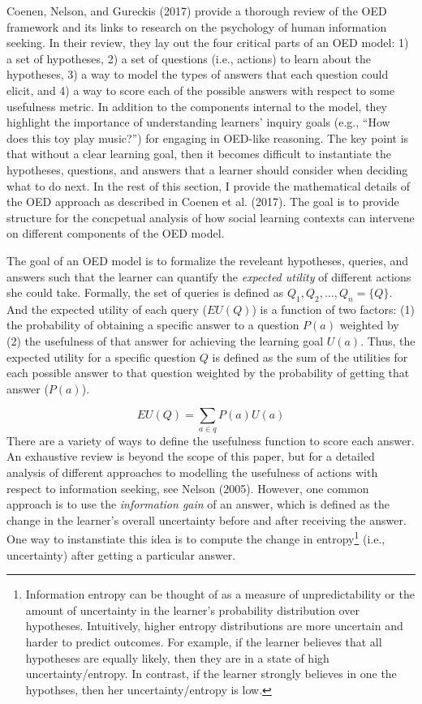 \documentclass[english,floatsintext,man]{apa6}
\theoremstyle{definition}
\theoremstyle{definition}
\theoremstyle{definition}
\theoremstyle{remark}
\begin{document}
Coenen, Nelson, and Gureckis (2017) provide a thorough review of the OED
framework and its links to research on the psychology of human
information seeking. In their review, they lay out the four critical
parts of an OED model: 1) a set of hypotheses, 2) a set of questions
(i.e., actions) to learn about the hypotheses, 3) a way to model the
types of answers that each question could elicit, and 4) a way to score
each of the possible answers with respect to some usefulness metric. In
addition to the components internal to the model, they highlight the
importance of understanding learners' inquiry goals (e.g., \enquote{How
does this toy play music?}) for engaging in OED-like reasoning. The key
point is that without a clear learning goal, then it becomes difficult
to instantiate the hypotheses, questions, and answers that a learner
should consider when deciding what to do next. In the rest of this
section, I provide the mathematical details of the OED approach as
described in Coenen et al. (2017). The goal is to provide structure for
the concpetual analysis of how social learning contexts can intervene on
different components of the OED model.

The goal of an OED model is to formalize the reveleant hypotheses,
queries, and answers such that the learner can quantify the
\emph{expected utility} of different actions she could take. Formally,
the set of queries is defined as \(Q_1, Q_2,..., Q_n = \{Q\}\). And the
expected utility of each query (\(EU(Q)\)) is a function of two factors:
(1) the probability of obtaining a specific answer to a question
\(P(a)\) weighted by (2) the usefulness of that answer for achieving the
learning goal \(U(a)\). Thus, the expected utility for a specific
question \(Q\) is defined as the sum of the utilities for each possible
answer to that question weighted by the probability of getting that
answer (\(P(a)\)).

\[EU(Q) = \sum_{a\in q}{P(a)U(a)}\] \noindent
There are a variety of ways to define the usefulness function to score
each answer. An exhaustive review is beyond the scope of this paper, but
for a detailed analysis of different approaches to modelling the
usefulness of actions with respect to information seeking, see Nelson
(2005). However, one common approach is to use the \emph{information
gain} of an answer, which is defined as the change in the learner's
overall uncertainty before and after receiving the answer. One way to
instanstiate this idea is to compute the change in entropy\footnote{Information
  entropy can be thought of as a measure of unpredictability or the
  amount of uncertainty in the learner's probability distribution over
  hypotheses. Intuitively, higher entropy distributions are more
  uncertain and harder to predict outcomes. For example, if the learner
  believes that all hypotheses are equally likely, then they are in a
  state of high uncertainty/entropy. In contrast, if the learner
  strongly believes in one the hypothses, then her uncertainty/entropy
  is low.} (i.e., uncertainty) after getting a particular answer.
\end{document}
